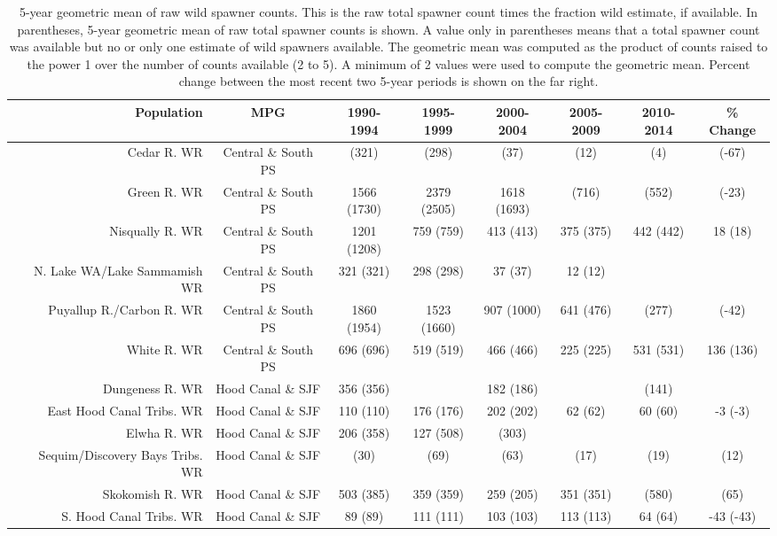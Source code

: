 \documentclass[]{article}
\begin{document}
\begin{landscape}\begin{table}[p]
\centering
\caption{5-year geometric mean of raw wild spawner counts. This is the raw total spawner count times the fraction wild estimate, if available.  In parentheses, 5-year geometric mean of raw total spawner counts is shown. A value only in parentheses means that a total spawner count was available but no or only one estimate of wild spawners available. The geometric mean was computed as the product of counts raised to the power 1 over the number of counts available (2 to 5). A minimum of 2 values were used to compute the geometric mean. Percent change between the most recent two 5-year periods is shown on the far right.} 
\begin{tabular}{r|c|cccccc}
  \hline
Population & MPG & 1990-1994 & 1995-1999 & 2000-2004 & 2005-2009 & 2010-2014 & \% Change \\ 
  \hline
Cedar R. WR & Central \& South PS &  (321) &  (298) &  (37) &  (12) &  (4) &  (-67) \\ 
  Green R. WR & Central \& South PS & 1566 (1730) & 2379 (2505) & 1618 (1693) &  (716) &  (552) &  (-23) \\ 
  Nisqually R. WR & Central \& South PS & 1201 (1208) & 759 (759) & 413 (413) & 375 (375) & 442 (442) & 18 (18) \\ 
  N. Lake WA/Lake Sammamish WR & Central \& South PS & 321 (321) & 298 (298) & 37 (37) & 12 (12) &  &  \\ 
  Puyallup R./Carbon R. WR & Central \& South PS & 1860 (1954) & 1523 (1660) & 907 (1000) & 641 (476) &  (277) &  (-42) \\ 
  White R. WR & Central \& South PS & 696 (696) & 519 (519) & 466 (466) & 225 (225) & 531 (531) & 136 (136) \\ 
  Dungeness R. WR & Hood Canal \& SJF & 356 (356) &  & 182 (186) &  &  (141) &  \\ 
  East Hood Canal Tribs. WR & Hood Canal \& SJF & 110 (110) & 176 (176) & 202 (202) & 62 (62) & 60 (60) & -3 (-3) \\ 
  Elwha R. WR & Hood Canal \& SJF & 206 (358) & 127 (508) &  (303) &  &  &  \\ 
  Sequim/Discovery Bays Tribs. WR & Hood Canal \& SJF &  (30) &  (69) &  (63) &  (17) &  (19) &  (12) \\ 
  Skokomish R. WR & Hood Canal \& SJF & 503 (385) & 359 (359) & 259 (205) & 351 (351) &  (580) &  (65) \\ 
  S. Hood Canal Tribs. WR & Hood Canal \& SJF & 89 (89) & 111 (111) & 103 (103) & 113 (113) & 64 (64) & -43 (-43) \\ 

\end{tabular}
\end{table}
\end{landscape}
\end{document}
